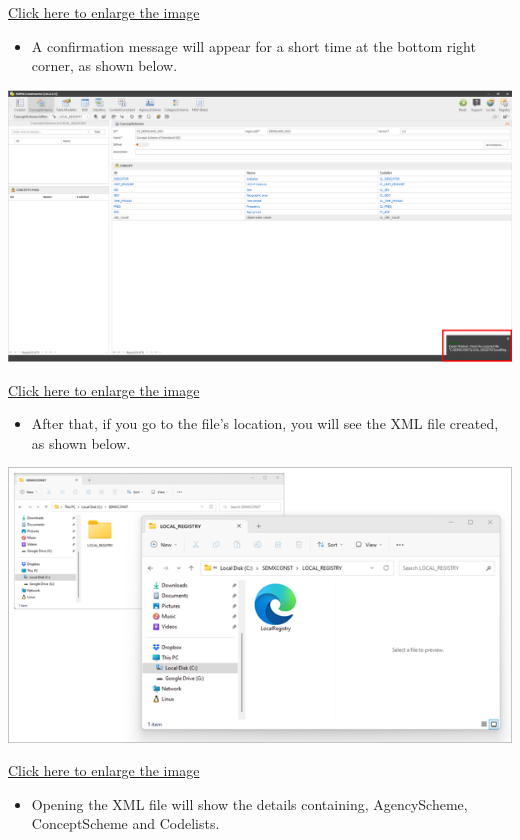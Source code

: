 \documentclass[
]{book}
\providecommand{\tightlist}{%
  \setlength{\itemsep}{0pt}\setlength{\parskip}{0pt}}
\begin{document}
\href{images/image125.png}{Click here to enlarge the image}

\begin{itemize}
\tightlist
\item
  A confirmation message will appear for a short time at the bottom right corner, as shown below.
\end{itemize}

\begin{center}\includegraphics[width=1\linewidth]{./images/image127} \end{center}

\href{images/image127.png}{Click here to enlarge the image}

\begin{itemize}
\tightlist
\item
  After that, if you go to the file's location, you will see the XML file created, as shown below.
\end{itemize}

\begin{center}\includegraphics[width=0.5\linewidth]{./images/image129} \end{center}

\href{images/image129.png}{Click here to enlarge the image}

\begin{itemize}
\tightlist
\item
  Opening the XML file will show the details containing, AgencyScheme, ConceptScheme and Codelists.
\end{itemize}
\end{document}
